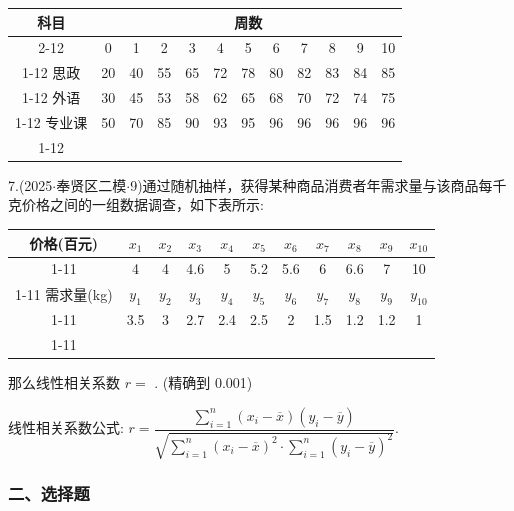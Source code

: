 \begin{center}

\begin{tabular}{|c|c|c|c|c|c|c|c|c|c|c|c|}
\hline
\multirow{2}{*}{科目} & \multicolumn{11}{|c|}{周数} \\
\cline{2-12}
 & 0 & 1 & 2 & 3 & 4 & 5 & 6 & 7 & 8 & 9 & 10 \\
\cline{1-12}
思政 & 20 & 40 & 55 & 65 & 72 & 78 & 80 & 82 & 83 & 84 & 85 \\
\cline{1-12}
外语 & 30 & 45 & 53 & 58 & 62 & 65 & 68 & 70 & 72 & 74 & 75 \\
\cline{1-12}
专业课 & 50 & 70 & 85 & 90 & 93 & 95 & 96 & 96 & 96 & 96 & 96 \\
\cline{1-12}
\hline
\end{tabular}
\end{center}

7.(2025$\cdot$奉贤区二模$\cdot$9)通过随机抽样，获得某种商品消费者年需求量与该商品每千克价格之间的一组数据调查，如下表所示:

\begin{center}

\begin{tabular}{|c|c|c|c|c|c|c|c|c|c|c|}
\hline
价格(百元) & ${x}_{1}$ & ${x}_{2}$ & ${x}_{3}$ & ${x}_{4}$ & ${x}_{5}$ & ${x}_{6}$ & ${x}_{7}$ & ${x}_{8}$ & ${x}_{9}$ & ${x}_{10}$ \\
\cline{1-11}
\phantom{X} & 4 & 4 & 4.6 & 5 & 5.2 & 5.6 & 6 & 6.6 & 7 & 10 \\
\cline{1-11}
需求量(kg) & ${y}_{1}$ & ${y}_{2}$ & ${y}_{3}$ & ${y}_{4}$ & ${y}_{5}$ & ${y}_{6}$ & ${y}_{7}$ & ${y}_{8}$ & ${y}_{9}$ & ${y}_{10}$ \\
\cline{1-11}
\phantom{X} & 3.5 & 3 & 2.7 & 2.4 & 2.5 & 2 & 1.5 & 1.2 & 1.2 & 1 \\
\cline{1-11}
\hline
\end{tabular}
\end{center}

那么线性相关系数 $r =$ \blkda[2]{}. (精确到 0.001)

线性相关系数公式: $r = \dfrac{\mathop{\sum }\limits_{{i = 1}}^{n}\left( {{x}_{i} - \overline{x}}\right) \left( {{y}_{i} - \overline{y}}\right) }{\sqrt{\mathop{\sum }\limits_{{i = 1}}^{n}{\left( {x}_{i} - \overline{x}\right) }^{2} \cdot  \mathop{\sum }\limits_{{i = 1}}^{n}{\left( {y}_{i} - \overline{y}\right) }^{2}}}$.

\subsubsection*{二、选择题}

